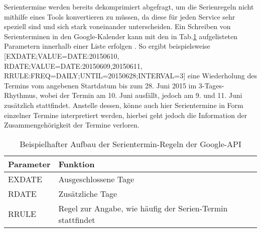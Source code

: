 Serientermine werden bereits dekomprimiert abgefragt, um die Serienregeln nicht mithilfe eines Tools konvertieren zu müssen, da diese für jeden Service sehr speziell sind und sich stark voneinander unterscheiden. Ein Schreiben von Serienterminen in den Google-Kalender kann mit den in Tab.\ref{tab:google-recurrence} aufgelisteten Parametern innerhalb einer Liste erfolgen \cite{GoogleLLC.13.05.2019}. So ergibt beispielsweise [\grqq{}EXDATE;VALUE=DATE:20150610\grqq{},
\grqq{}RDATE;VALUE=DATE:20150609,20150611\grqq{},
\grqq{}RRULE:FREQ=DAILY;UNTIL=20150628;INTERVAL=3\grqq{}] eine Wiederholung des Termins vom angebenen Startdatum bis zum 28. Juni 2015 im 3-Tages-Rhythmus, wobei der Termin am 10. Juni ausfällt, jedoch am 9. und 11. Juni zusätzlich stattfindet. Anstelle dessen, könne auch hier Serientermine in Form einzelner Termine interpretiert werden, hierbei geht jedoch die Information der Zusammengehörigkeit der Termine verloren.

\begin{table}[h]
	\caption{Beispielhafter Aufbau der Serientermin-Regeln der Google-API}
	\label{tab:google-recurrence}
	\begin{tabularx}{\textwidth}{ | l | X | }
		\hline
		Parameter & Funktion \\ \hline
		EXDATE & Ausgeschlossene Tage \\ 
		RDATE & Zusätzliche Tage \\ 
		RRULE & Regel zur Angabe, wie häufig der Serien-Termin stattfindet \\
		\hline
	\end{tabularx}
\end{table}